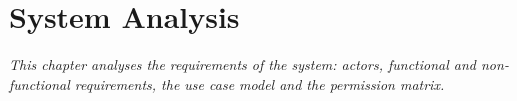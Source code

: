 \chapter{System Analysis}
\label{chapter:phantich}

\textit{This chapter analyses the requirements of the system: actors, functional and non-functional requirements, the use case model and the permission matrix.}







